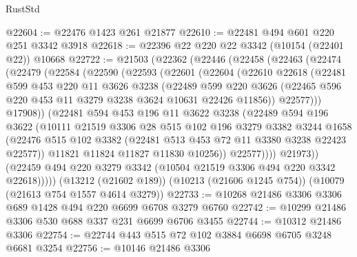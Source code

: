 \begin{lexlean}{RustStd}
\begin{coremodule}
@22604 := @22476 @1423 @261 @21877
@22610 := @22481 @494 @601 @220 @251 @3342 @3918
@22618 := @22396 @22 @220 @22 @3342 (@10154 (@22401 @22)) @10668
@22722 := @21503
    (@22362
      (@22446
        (@22458
          (@22463
            (@22474
              (@22479
                (@22584
                  (@22590
                    (@22593
                      (@22601
                        (@22604
                          (@22610
                            @22618
                            (@22481
                              @599
                              @453
                              @220
                              @11
                              @3626
                              @3238
                              (@22489
                                @599
                                @220
                                @3626
                                (@22465 @596 @220 @453 @11 @3279 @3238 @3624 @10631 @22426 @11856))
                              @22577)))
                        @17908))
                    (@22481
                      @594
                      @453
                      @196
                      @11
                      @3622
                      @3238
                      (@22489
                        @594
                        @196
                        @3622
                        (@10111
                          @21519
                          @3306
                          @28
                          @515
                          @102
                          @196
                          @3279
                          @3382
                          @3244
                          @1658
                          (@22476
                            @515
                            @102
                            @3382
                            (@22481 @513 @453 @72 @11 @3380 @3238 @22423 @22577))
                          @11821
                          @11824
                          @11827
                          @11830
                          @10256))
                      @22577))))
              @21973))
          (@22459 @494 @220 @3279 @3342 (@10504 @21519 @3306 @494 @220 @3342 @22618)))))
    (@13212 (@21602 @189))
    (@10213 (@21606 @1245 @754))
    (@10079 (@21613 @754 @1557 @4614 @3279))
@22733 := @10268 @21486 @3306 @3306 @689 @1428 @494 @220 @6699 @6708 @3279 @6760
@22742 := @10299 @21486 @3306 @530 @688 @337 @231 @6699 @6706 @3455
@22744 := @10312 @21486 @3306
@22754 := @22744 @443 @515 @72 @102 @3884 @6698 @6705 @3248 @6681 @3254
@22756 := @10146 @21486 @3306

\end{coremodule}
\end{lexlean}
